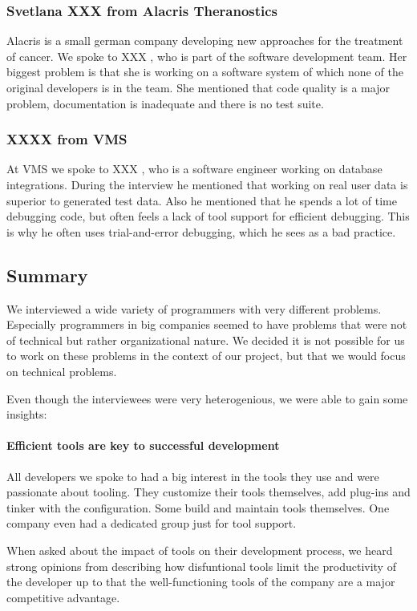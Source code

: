 \subsubsection{Svetlana XXX from Alacris Theranostics}  Alacris is a small german company developing new approaches for the treatment of cancer. We spoke to XXX , who is part of the software development team. Her biggest problem is that she is working on a software system of which none of the original developers is in the team. She mentioned that code quality is a major problem, documentation is inadequate and there is no test suite.

\subsubsection{XXXX from VMS} At VMS we spoke to XXX , who is a software engineer working on database integrations. During the interview he mentioned that working on real user data is superior to generated test data. Also he mentioned that he spends a lot of time debugging code, but often feels a lack of tool support for efficient debugging. This is why he often uses trial-and-error debugging, which he sees as a bad practice.

\subsection{Summary} We interviewed a wide variety of programmers with very different problems. Especially programmers in big companies seemed to have problems that were not of technical but rather organizational nature. We decided it is not possible for us to work on these problems in the context of our project, but that we would focus on technical problems.

Even though the interviewees were very heterogenious, we were able to gain some insights:

\paragraph{Efficient tools are key to successful development} All developers we spoke to had a big interest in the tools they use and were passionate about tooling. They customize their tools themselves, add plug-ins and tinker with the configuration. Some build and maintain tools themselves. One company even had a dedicated group just for tool support.

When asked about the impact of tools on their development process, we heard strong opinions from describing how disfuntional tools limit the productivity of the developer up to that the well-functioning tools of the company are a major competitive advantage.


